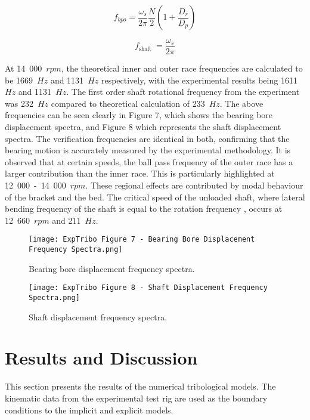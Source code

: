 \begin{equation}\label{ball pass frequency outer}
	f_{b p o}=\frac{\omega_s}{2 \pi} \frac{N}{2}\left(1+\frac{D_r}{D_p}\right)
\end{equation}

\begin{equation}\label{ball pass frequency shaft}
	f_{\text {shaft }}=\frac{\omega_s}{2 \pi}
\end{equation}

At 14~000~$rpm$, the theoretical inner and outer race frequencies are calculated to be 1669~$Hz$ and 1131~$Hz$ respectively, with the experimental results being 1611~$Hz$ and 1131~$Hz$. The first order shaft rotational frequency from the experiment was 232~$Hz$ compared to theoretical calculation of 233~$Hz$. The above frequencies can be seen clearly in Figure 7, which shows the bearing bore displacement spectra, and Figure 8 which represents the shaft displacement spectra. The verification frequencies are identical in both, confirming that the bearing motion is accurately measured by the experimental methodology. It is observed that at certain speeds, the ball pass frequency of the outer race has a larger contribution than the inner race. This is particularly highlighted at 12~000~-~14~000~$rpm$. These regional effects are contributed by modal behaviour of the bracket and the bed. The critical speed of the unloaded shaft, where lateral bending frequency of the shaft is equal to the rotation frequency \cite{Shigley'sMechanicalEngineeringDesign}, occurs at 12~660~$rpm$ and 211~$Hz$.

\begin{figure}
	\texttt{[image: ExpTribo Figure 7 - Bearing Bore Displacement Frequency Spectra.png]}
	\caption{Bearing bore displacement frequency spectra.}
	\label{Bearing bore displacement frequency spectra}
\end{figure}

\begin{figure}
	\texttt{[image: ExpTribo Figure 8 - Shaft Displacement Frequency Spectra.png]}
	\caption{Shaft displacement frequency spectra.}
	\label{Shaft displacement frequency spectra}
\end{figure}

\section{Results and Discussion}
This section presents the results of the numerical tribological models. The kinematic data from the experimental test rig are used as the boundary conditions to the implicit and explicit models.

